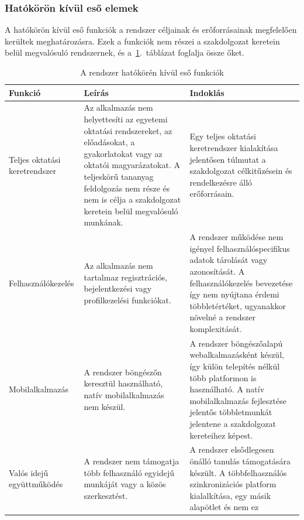 \subsubsection{Hatókörön kívül eső elemek}
A hatókörön kívül eső funkciók a rendszer céljainak és 
erőforrásainak megfelelően kerültek meghatározásra. 
Ezek a funkciók nem részei a szakdolgozat keretein belül 
megvalósuló rendszernek, és a~\ref{tab:out_of_scope}.~táblázat foglalja össze őket.
\begin{table}[H]
      \centering 
      \begin{tabularx}{\textwidth}{|>{\raggedright\arraybackslash}p{3.2cm}|>{\raggedright\arraybackslash}X|>{\raggedright\arraybackslash}X|}
            \hline 
            \textbf{Funkció} & \textbf{Leírás} & \textbf{Indoklás} \\ 
            \hline
            Teljes oktatási keretrendszer &
            Az alkalmazás nem helyettesíti az egyetemi oktatási
            rendszereket, az előadásokat, a gyakorlatokat vagy az oktatói
            magyarázatokat. A teljeskörű tananyag feldolgozás nem része és nem is célja a szakdolgozat keretein belül megvalósuló munkának.
            & Egy teljes oktatási keretrendszer kialakítása jelentősen túlmutat a szakdolgozat célkitűzésein és rendelkezésre álló erőforrásain. \\ \hline
            Felhasználókezelés &
            Az alkalmazás nem tartalmaz regisztrációs, bejelentkezési vagy
            profilkezelési funkciókat. & A rendszer működése nem igényel felhasználóspecifikus adatok tárolását vagy azonosítását. A felhasználókezelés bevezetése így nem nyújtana érdemi többletértéket, ugyanakkor növelné a rendszer komplexitását.  \\ \hline
            Mobilalkalmazás &
            A rendszer böngészőn keresztül használható, natív
            mobilalkalmazás nem készül.  & A rendszer böngészőalapú webalkalmazásként készül, így külön telepítés nélkül több platformon is használható. A natív mobilalkalmazás fejlesztése jelentős többletmunkát jelentene a szakdolgozat kereteihez képest.\\ \hline
            Valós idejű együttműködés &
            A rendszer nem támogatja több felhasználó egyidejű munkáját
            vagy a közös szerkesztést. & A rendszer elsődlegesen önálló tanulás támogatására készült. A többfelhasználós szinkronizációs platform kialalkítása, egy másik alapötlet és nem ez \\
            \hline
      \end{tabularx}
      \caption{A rendszer hatókörén kívül eső funkciók}
      \label{tab:out_of_scope}
\end{table}

